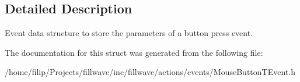 \subsection{Detailed Description}
Event data structure to store the parameters of a button press event. 

The documentation for this struct was generated from the following file\+:\begin{DoxyCompactItemize}
\item 
/home/filip/\+Projects/fillwave/inc/fillwave/actions/events/Mouse\+Button\+T\+Event.\+h\end{DoxyCompactItemize}
